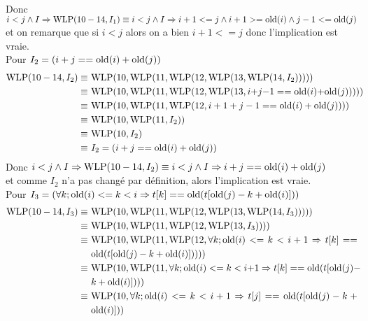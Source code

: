 \documentclass[11pt,answers]{exam}
\begin{document}
\begin{questions}
\begin{parts}
\begin{solutionorbox}
\begin{align*}
      \end{align*}
      Donc $i < j \land I \Rightarrow \mathrm{WLP}(10-14,I_1)\\
      \equiv i < j \land I \Rightarrow i+1 <= j \wedge i+1 >= \mathrm{old}(i) \wedge j-1 <= \mathrm{old}(j) $\\
      et on remarque que si $i<j$ alors on a bien $i+1<=j$ donc l'implication est vraie.\\
      Pour $I_2 = (i + j == \mathrm{old}(i) + \mathrm{old}(j))$
      \begin{align*}
        \WLP(10-14,I_2) \equiv & ~\breaktowidth{10cm}{\WLP(10, \WLP(11, \WLP(12, \WLP(13, \WLP(14, I_2)))))}\\
        \equiv               & ~\breaktowidth{10cm}{\WLP(10, \WLP(11, \WLP(12, \WLP(13, i + j-1 == \old(i) + \old(j)))))}\\
        \equiv               & ~\breaktowidth{10cm}{\WLP(10, \WLP(11, \WLP(12, i+1 + j-1 == \old(i) + \old(j))))}\\
        \equiv               & ~\breaktowidth{10cm}{\WLP(10, \WLP(11, I_2))}\\
        \equiv               & ~\breaktowidth{10cm}{\WLP(10, I_2)}\\
        \equiv               & ~\breaktowidth{10cm}{I_2 = (i + j == \old(i) + \old(j))}
      \end{align*}
      Donc $i < j \land I \Rightarrow \mathrm{WLP}(10-14,I_2)\\
      \equiv i < j \land I \Rightarrow i + j == \mathrm{old}(i) + \mathrm{old}(j) $\\
      et comme $I_2$ n'a pas changé par définition, alors l'implication est vraie.\\
      Pour $I_3 = (\forall k; \mathrm{old}(i) <= k < i \Rightarrow t[k] == \mathrm{old}(t[\mathrm{old}(j)-k+\mathrm{old}(i)]))$
      \begin{align*}
        \WLP(10-14,I_3) \equiv & ~\breaktowidth{10cm}{\WLP(10, \WLP(11, \WLP(12, \WLP(13, \WLP(14, I_3)))))}\\
        \equiv               & ~\breaktowidth{10cm}{\WLP(10, \WLP(11, \WLP(12, \WLP(13, I_3))))}\\
        \equiv               & ~\breaktowidth{10cm}{\WLP(10, \WLP(11, \WLP(12, \forall k; \old(i) <= k < i+1 \Rightarrow t[k] == \old(t[\old(j)-k+\old(i)]))))}\\
        \equiv               & ~\breaktowidth{10cm}{\WLP(10, \WLP(11, \forall k; \old(i) <= k < i+1 \Rightarrow t[k] == \old(t[\old(j)-k+\old(i)])))}\\
        \equiv               & ~\breaktowidth{10cm}{\WLP(10, \forall k; \old(i) <= k < i+1 \Rightarrow t[j] == \old(t[\old(j)-k+\old(i)]))}\\

\end{align*}
\end{solutionorbox}
\end{parts}
\end{questions}
\end{document}
